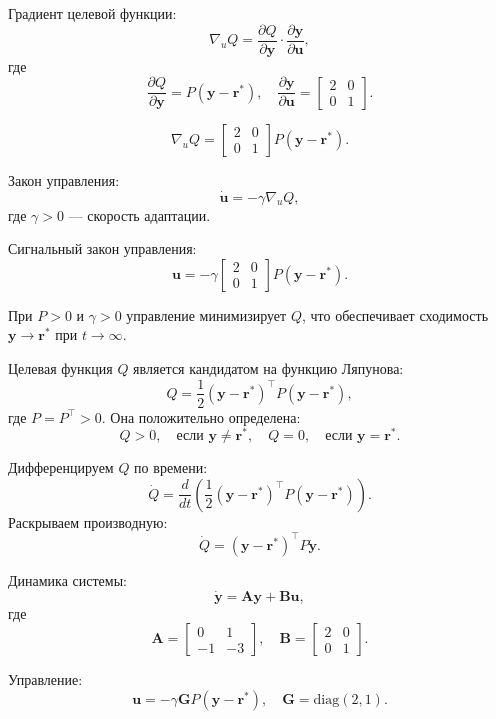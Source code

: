 \documentclass[a4paper,12pt]{extarticle} %
\begin{document}
Градиент целевой функции:
\[
\nabla_u Q = \frac{\partial Q}{\partial \mathbf{y}} \cdot \frac{\partial \mathbf{y}}{\partial \mathbf{u}},
\]
где
\[
\frac{\partial Q}{\partial \mathbf{y}} = P (\mathbf{y} - \mathbf{r}^*), \quad
\frac{\partial \mathbf{y}}{\partial \mathbf{u}} = \begin{bmatrix} 2 & 0 \\ 0 & 1 \end{bmatrix}.
\]


\[
\nabla_u Q = \begin{bmatrix} 2 & 0 \\ 0 & 1 \end{bmatrix} P (\mathbf{y} - \mathbf{r}^*).
\]

Закон управления:
\[
\dot{\mathbf{u}} = -\gamma \nabla_u Q,
\]
где \( \gamma > 0 \) — скорость адаптации.

Сигнальный закон управления:
\[
\mathbf{u} = -\gamma \begin{bmatrix} 2 & 0 \\ 0 & 1 \end{bmatrix} P (\mathbf{y} - \mathbf{r}^*).
\]

При \( P > 0 \) и \( \gamma > 0 \) управление минимизирует \( Q \), что обеспечивает сходимость \( \mathbf{y} \to \mathbf{r}^* \) при \( t \to \infty \).


Целевая функция \( Q \) является кандидатом на функцию Ляпунова:
\[
Q = \frac{1}{2} (\mathbf{y} - \mathbf{r}^*)^\top P (\mathbf{y} - \mathbf{r}^*),
\]
где \( P = P^\top > 0 \). Она положительно определена:
\[
Q > 0, \quad \text{если } \mathbf{y} \neq \mathbf{r}^*, \quad Q = 0, \quad \text{если } \mathbf{y} = \mathbf{r}^*.
\]


Дифференцируем \( Q \) по времени:
\[
\dot{Q} = \frac{d}{dt} \left( \frac{1}{2} (\mathbf{y} - \mathbf{r}^*)^\top P (\mathbf{y} - \mathbf{r}^*) \right).
\]
Раскрываем производную:
\[
\dot{Q} = (\mathbf{y} - \mathbf{r}^*)^\top P \dot{\mathbf{y}}.
\]

Динамика системы:
\[
\dot{\mathbf{y}} = \mathbf{A} \mathbf{y} + \mathbf{B} \mathbf{u},
\]
где
\[
\mathbf{A} = \begin{bmatrix} 0 & 1 \\ -1 & -3 \end{bmatrix}, \quad
\mathbf{B} = \begin{bmatrix} 2 & 0 \\ 0 & 1 \end{bmatrix}.
\]

Управление:
\[
\mathbf{u} = -\gamma \mathbf{G} P (\mathbf{y} - \mathbf{r}^*), \quad \mathbf{G} = \text{diag}(2, 1).
\]
\end{document}
